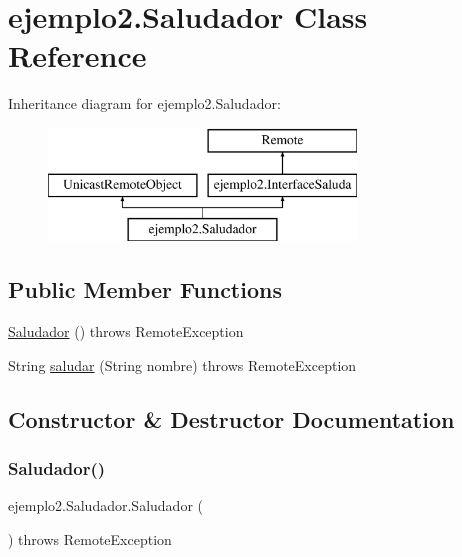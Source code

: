 \hypertarget{classejemplo2_1_1_saludador}{}\section{ejemplo2.\+Saludador Class Reference}
\label{classejemplo2_1_1_saludador}
Inheritance diagram for ejemplo2.\+Saludador\+:\begin{figure}[H]
\begin{center}
\leavevmode
\includegraphics[height=3.000000cm]{classejemplo2_1_1_saludador}
\end{center}
\end{figure}
\subsection*{Public Member Functions}
\begin{DoxyCompactItemize}
\item 
\mbox{\hyperlink{classejemplo2_1_1_saludador_af13cd34bc14c4ad31c2046377b783fe4}{Saludador}} ()  throws Remote\+Exception 
\item 
String \mbox{\hyperlink{classejemplo2_1_1_saludador_a5db6e424a0c2570a9b66f4828041f9b3}{saludar}} (String nombre)  throws Remote\+Exception       
\end{DoxyCompactItemize}


\subsection{Constructor \& Destructor Documentation}
\mbox{\label{classejemplo2_1_1_saludador_af13cd34bc14c4ad31c2046377b783fe4}} 
\subsubsection{\texorpdfstring{Saludador()}{Saludador()}}
{\footnotesize\ttfamily ejemplo2.\+Saludador.\+Saludador (\begin{DoxyParamCaption}{ }\end{DoxyParamCaption}) throws Remote\+Exception\hspace{0.3cm}{\ttfamily [inline]}}


